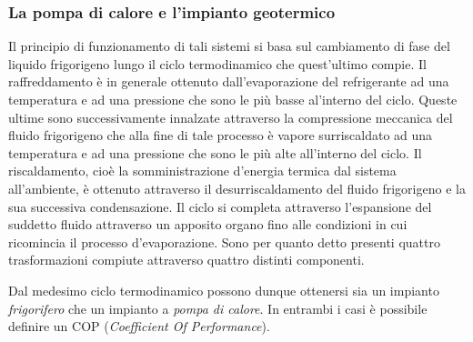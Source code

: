 \subsubsection{La pompa di calore e l'impianto geotermico}
Il principio di funzionamento di tali sistemi si basa sul cambiamento di fase del liquido frigorigeno lungo il ciclo termodinamico che quest'ultimo compie. Il raffreddamento è in generale ottenuto dall'evaporazione del refrigerante ad una temperatura e ad una pressione che sono le più basse al'interno del ciclo. Queste ultime sono successivamente innalzate attraverso la compressione meccanica del fluido frigorigeno che alla fine di tale processo è vapore surriscaldato ad una temperatura e ad una pressione che sono le più alte all'interno del ciclo. Il riscaldamento, cioè la somministrazione d'energia termica dal sistema all'ambiente, è ottenuto attraverso il desurriscaldamento del fluido frigorigeno e la sua successiva condensazione. Il ciclo si completa attraverso l'espansione del suddetto fluido attraverso un apposito organo fino alle condizioni in cui ricomincia il processo d'evaporazione. Sono per quanto detto presenti quattro trasformazioni compiute attraverso quattro distinti componenti.

Dal medesimo ciclo termodinamico possono dunque ottenersi sia un impianto \emph{frigorifero} che un impianto a \emph{pompa di calore}. In entrambi i casi è possibile definire un COP (\emph{Coefficient Of Performance}). 

